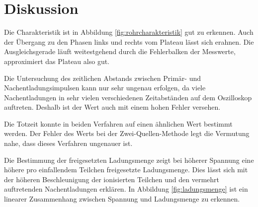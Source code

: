 \section{Diskussion}
\label{sec:Diskussion}

Die Charakteristik ist in Abbildung \ref{fig:rohrcharakteristik} gut zu erkennen.
Auch der Übergang zu den Phasen links und rechts vom Plateau lässt sich erahnen.
Die Ausgleichsgerade läuft weitestgehend durch die Fehlerbalken der Messwerte, approximiert
das Plateau also gut.

Die Untersuchung des zeitlichen Abstands zwischen Primär- und Nachentladungsimpulsen
kann nur sehr ungenau erfolgen, da viele Nachentladungen in sehr vielen verschiedenen
Zeitabständen auf dem Oszilloskop auftreten. Deshalb ist der Wert auch mit einem hohen Fehler
versehen.

Die Totzeit konnte in beiden Verfahren auf einen ähnlichen Wert bestimmt werden.
Der Fehler des Werts bei der Zwei-Quellen-Methode legt die Vermutung nahe, dass
dieses Verfahren ungenauer ist.

Die Bestimmung der freigesetzten Ladungsmenge zeigt bei höherer Spannung eine höhere
pro einfallendem Teilchen freigesetzte Ladungsmenge. Dies lässt sich mit der höheren
Beschleunigung der ionisierten Teilchen und den vermehrt auftretenden Nachentladungen
erklären. In Abbildung \ref{fig:ladungsmenge} ist ein linearer Zusammenhang zwischen Spannung
und Ladungsmenge zu erkennen.
